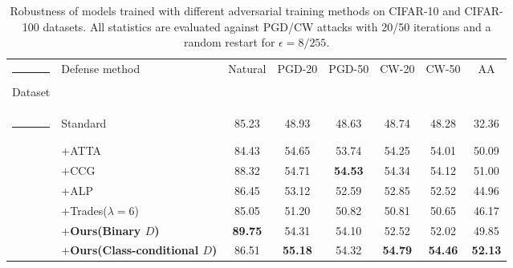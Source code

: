 \documentclass[10pt,twocolumn,letterpaper]{article}
\makeatletter
\def\hlinew#1{%
  \noalign{\ifnum0=`}\fi\hrule \@height #1 \futurelet
   \reserved@a\@xhline}
\makeatother
\begin{document}
\begin{table*}[!t]
    \centering
    \fontsize{9.5}{11}\selectfont
    \caption{Robustness of models trained with different adversarial training methods on CIFAR-10 and CIFAR-100 datasets. All statistics are evaluated against PGD/CW attacks with 20/50 iterations and a random restart for $\epsilon=8/255$. %
    }
    \label{tab:white-box-result}
        \begin{tabular}{c|l|c|ccccc}
        \hlinew{1pt}
        {Dataset} &
        {Defense method} &
         
          {{Natural}} &
          {{PGD-20}} &
          {{PGD-50}} &
         {{CW-20}} &
          {{CW-50}} &
          {AA} \\ \hlinew{1pt}
          
        \multirow{7}{*}{CIFAR-10}  
                  & Standard~\cite{madry2018towards}       & 85.23 & 48.93 & 48.63 & 48.74 & 48.28  &32.36 \\
                  & +ATTA~\cite{zheng2020efficient}     & 84.43 & 54.65 & 53.74 & 54.25 & 54.01  &50.09 \\
                  & +CCG~\cite{tack2021consistency}     &  {88.32} & 54.71  & \textbf{54.53}  & 54.34  & 54.12 &51.00 \\
                  & +ALP~\cite{58kannan2018adversarial} & 86.45 & 53.12 & 52.59 & 52.85  & 52.52 &44.96\\
                  
                  & +Trades($\lambda=6$)~\cite{Zhang2019tradeoff}      & 85.05 & 51.20 & 50.82 & 50.81 & 50.65  & 46.17\\
                  
                  
                  & +\textbf{Ours(Binary $D$)}  &\textbf{89.75} &54.31 &54.10 &52.52 &52.02  &49.85 \\
                  & +\textbf{Ours(Class-conditional $D$)}  & 86.51 & \textbf{55.18} & 54.32 & \textbf{54.79} &\textbf{54.46}&\textbf{52.13}\\\hline \hline
        

\end{tabular}
\end{table*}
\end{document}
